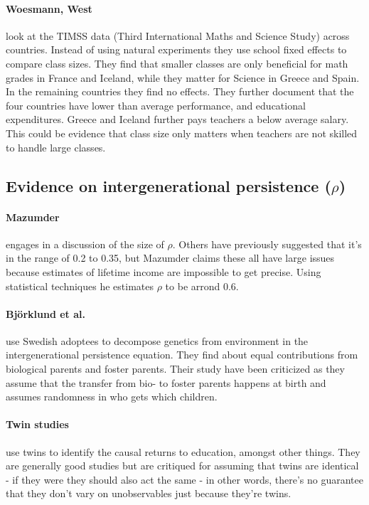 \documentclass[12pt, a4paper]{article}
\begin{document}
\begin{multicols}{2}
\paragraph{Woesmann, West} look at the TIMSS data (Third International Maths and Science Study) across countries. Instead of using natural experiments they use school fixed effects to compare class sizes. They find that smaller classes are only beneficial for math grades in France and Iceland, while they matter for Science in Greece and Spain. In the remaining countries they find no effects. They further document that the four countries have lower than average performance, and educational expenditures. Greece and Iceland further pays teachers a below average salary. This could be evidence that class size only matters when teachers are not skilled to handle large classes.

\subsection{Evidence on intergenerational persistence ($\rho$)}

\paragraph{Mazumder} engages in a discussion of the size of $\rho$. Others have previously suggested that it's in the range of 0.2 to 0.35, but Mazumder claims these all have large issues because estimates of lifetime income are impossible to get precise. Using statistical techniques he estimates $\rho$ to be arrond 0.6. 

\paragraph{Björklund et al.} use Swedish adoptees to decompose genetics from environment in the intergenerational persistence equation. They find about equal contributions from biological parents and foster parents. Their study have been criticized as they assume that the transfer from bio- to foster parents happens at birth and assumes randomness in who gets which children. 

\paragraph{Twin studies} use twins to identify the causal returns to education, amongst other things. They are generally good studies but are critiqued for assuming that twins are identical - if they were they should also act the same - in other words, there's no guarantee that they don't vary on unobservables just because they're twins.  


\end{multicols}
\end{document}
